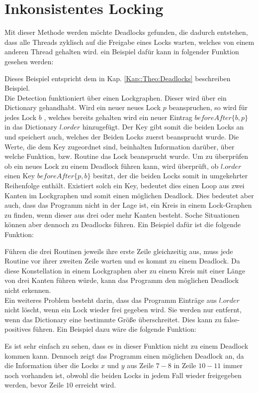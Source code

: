 \section{Inkonsistentes Locking} \label{Kap::Rev:Inconsistent}
Mit dieser Methode werden möchte Deadlocks gefunden, die dadurch entstehen,
dass alle Threads zyklisch auf die Freigabe eines Locks warten, welches von 
einem anderen Thread gehalten wird. ein Beispiel dafür kann in folgender Funktion
gesehen werden:
\begin{figure}[H]
    
\end{figure}
Dieses Beispiel entspricht dem in Kap. \ref*{Kap::Theo:Deadlocks} beschreiben 
Beispiel.\\
Die Detection funktioniert über einen Lockgraphen. Dieser wird über ein 
Dictionary gehandhabt. Wird ein neuer neues Lock $p$ beanspruchen, so wird für 
jedes Lock $b$ , welches bereits gehalten wird ein  
neuer Eintrag $beforeAfter\{b, p\}$ in das Dictionary $l.order$ hinzugefügt. 
Der Key gibt somit die beiden Locks an und speichert auch, welches der Beiden Locks
zuerst beansprucht wurde. Die Werte, die dem Key zugeordnet sind, beinhalten 
Information darüber, über welche Funktion, bzw. Routine das Lock beansprucht wurde.
Um zu überprüfen ob ein neues Lock zu einem Deadlock führen kann, wird überprüft,
ob $l.order$ einen Key $beforeAfter\{p, b\}$ besitzt, der die beiden Locks somit in 
umgekehrter Reihenfolge enthält. Existiert solch ein Key, bedeutet dies einen 
Loop aus zwei Kanten im Lockgraphen und somit einen möglichen Deadlock. 
Dies bedeutet aber auch, dass das Programm nicht in der Lage ist, ein Kreis 
in einem Lock-Graphen zu finden, wenn dieser aus drei oder mehr Kanten besteht.
Soche Situationen können aber dennoch zu Deadlocks führen. Ein Beispiel dafür 
ist die folgende Funktion:
\begin{figure}[H]
    
\end{figure}
Führen die drei Routinen jeweils ihre erste Zeile gleichzeitig aus, muss jede 
Routine vor ihrer zweiten Zeile warten und es kommt zu einem Deadlock. Da diese
Konstellation in einem Lockgraphen aber zu einem Kreis mit einer Länge von drei 
Kanten führen würde, kann das Programm den möglichen Deadlock nicht erkennen.\\
Ein weiteres Problem besteht darin, dass das Programm Einträge aus $l.order$ nicht 
löscht, wenn ein Lock wieder frei gegeben wird. Sie werden nur entfernt, wenn 
das Dictionary eine bestimmte Größe überschreitet. Dies kann zu false-positives
führen. Ein Beispiel dazu wäre die folgende Funktion:  
\begin{figure}[H]
    
\end{figure}
Es ist sehr einfach zu sehen, dass es in dieser Funktion nicht zu einem Deadlock 
kommen kann. Dennoch zeigt das Programm einen möglichen Deadlock an, da die 
Information über die Locks $x$ und $y$ aus Zeile $7-8$ in Zeile $10-11$ immer 
noch vorhanden ist, obwohl die beiden Locks in jedem Fall wieder freigegeben
werden, bevor Zeile $10$ erreicht wird.



